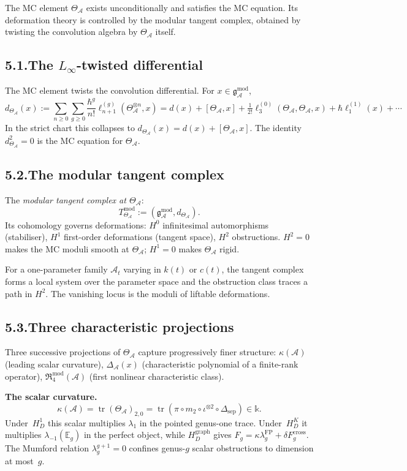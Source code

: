 \documentclass[11pt]{report}
\theoremstyle{definition}
\theoremstyle{remark}
\providecommand{\cA}{\mathcal{A}}
\providecommand{\gAmod}{\mathfrak{g}^{\mathrm{mod}}_\cA}
\providecommand{\Bbbk}{\mathbb{k}}
\numberwithin{equation}{section}
\begin{document}
The MC element $\Theta_\cA$ exists unconditionally and satisfies the
MC equation. Its deformation theory is controlled by the modular
tangent complex, obtained by twisting the convolution algebra by
$\Theta_\cA$ itself.

\subsection*{5.1.\enspace The $L_\infty$-twisted differential}

The MC element twists the convolution differential. For $x\in\gAmod$,
\[
d_{\Theta_\cA}(x):=\sum_{n\ge 0}\sum_{g\ge 0}\frac{\hbar^g}{n!}\ell_{n+1}^{(g)}(\Theta_\cA^{\otimes n},x)=d(x)+[\Theta_\cA,x]+\tfrac{1}{2!}\ell_3^{(0)}(\Theta_\cA,\Theta_\cA,x)+\hbar\ell_1^{(1)}(x)+\cdots
\]
In the strict chart this collapses to $d_{\Theta_\cA}(x)=d(x)+[\Theta_\cA,x]$.
The identity $d_{\Theta_\cA}^2=0$ is the MC equation for $\Theta_\cA$.

\subsection*{5.2.\enspace The modular tangent complex}

The \emph{modular tangent complex at $\Theta_\cA$}:
\[
T^{\mathrm{mod}}_{\Theta_\cA}:=(\gAmod,d_{\Theta_\cA}).
\]
Its cohomology governs deformations: $H^0$ infinitesimal automorphisms
(stabiliser), $H^1$ first-order deformations (tangent space), $H^2$
obstructions. $H^2=0$ makes the MC moduli smooth at $\Theta_\cA$;
$H^1=0$ makes $\Theta_\cA$ rigid.

For a one-parameter family $\cA_t$ varying in $k(t)$ or $c(t)$, the
tangent complex forms a local system over the parameter space and
the obstruction class traces a path in $H^2$. The vanishing locus
is the moduli of liftable deformations.

\subsection*{5.3.\enspace Three characteristic projections}

Three successive projections of $\Theta_\cA$ capture progressively
finer structure: $\kappa(\cA)$ (leading scalar curvature),
$\Delta_\cA(x)$ (characteristic polynomial of a finite-rank operator),
$\mathfrak R^{\mathrm{mod}}_4(\cA)$ (first nonlinear characteristic
class).

\medskip
\noindent\textbf{The scalar curvature.}\enspace
\[
\kappa(\cA)=\operatorname{tr}(\Theta_\cA)_{2,0}=\operatorname{tr}(\pi\circ m_2\circ\iota^{\otimes 2}\circ\Delta_{\mathrm{sep}})\in\Bbbk.
\]
Under~$H_D^1$ this scalar multiplies $\lambda_1$ in the pointed
genus-one trace.  Under~$H_D^K$ it multiplies
$\lambda_{-1}(\mathbb E_g)$ in the perfect object, while
$H_D^{\mathrm{graph}}$ gives
$F_g=\kappa\lambda_g^{\mathrm{FP}}+\delta F_g^{\mathrm{cross}}$.
The Mumford relation
$\lambda_g^{g+1}=0$ confines genus-$g$ scalar obstructions to
dimension at most~$g$.
\end{document}
